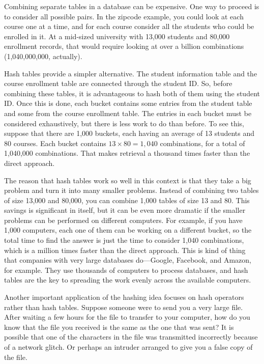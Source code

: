 Combining separate tables in a database can be expensive.
One way to proceed is to consider all possible pairs.
In the zipcode example, you could look at each course
one at a time, and for each course consider
all the students who could be enrolled in it.
At a mid-sized university with 13,000 students
and 80,000 enrollment records, that would require
looking at over a billion combinations (1,040,000,000, actually).

Hash tables provide a simpler alternative. The student information table
and the course enrollment table are connected through the student ID.
So, before combining these tables, it is advantageous to hash both of them
using the student ID. Once this is done, each bucket contains some entries
from the student table and some from the course enrollment table. The entries
in each bucket must be considered exhaustively, but there is less work to do
than before.
To see this, suppose that there are 1,000 buckets,
each having an average of 13 students and 80 courses. Each bucket
contains $13 \times 80 =1,040$ combinations,
for a total of 1,040,000 combinations.
That makes retrieval a thousand times faster than the direct approach.

The reason that hash tables work so well in this context is that they take
a big problem and turn it into many smaller problems. Instead
of combining two tables of size 13,000 and 80,000, you can combine 1,000
tables of size 13 and 80. This savings is significant in itself, but it can
be even more dramatic if the smaller problems can be performed on different
computers. For example, if you have 1,000 computers, each one of them can be
working on a different bucket, so the total time to find the answer is
just the time to consider 1,040 combinations, which is a million times
faster than the direct approach.
This is kind of thing that companies with very large databases do---Google, Facebook, and Amazon, for example.
They use thousands of computers to process databases, and
hash tables are the key to spreading
the work evenly across the available computers.

Another important application of the hashing idea focuses on hash operators
rather than hash tables.
Suppose someone were to send you a very large file.
After waiting a few hours
for the file to transfer to your computer, how do you know that the file
you received is the same as the one that was sent?
It is possible that one of the characters
in the file was transmitted incorrectly because of a network glitch.
Or perhaps an intruder arranged to give you a false copy of the file.

